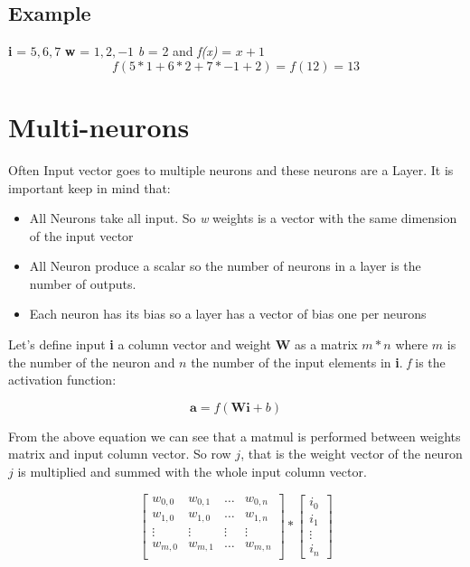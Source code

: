 \documentclass[12pt,a4paper,twoside,openright]{scrbook}
\begin{document}
\subsection{Example}
\textbf{i} = $5,6,7$ \textbf{w} = $1,2,-1$ \textit{b} = 2 and \textit{f(x)} = $x + 1$  
\begin{equation}
f(5*1 + 6*2 + 7*-1 + 2) = f(12) = 13
\end{equation}

\section{Multi-neurons}
Often Input vector goes to multiple neurons and these neurons are a Layer. It is important keep in mind that:
\begin{itemize}
\item All Neurons take all input. So \textit{w} weights is a vector with the same dimension of the input vector
\item All Neuron produce a scalar so the number of neurons in a layer is the number of  outputs.
\item Each neuron has its bias so a layer has a vector of bias one per neurons 
\end{itemize}

Let's define input \textbf{i} a column vector and weight \textbf{W} as a matrix $m*n$ where $m$ is the number of the neuron and $n$ the number of the input elements in \textbf{i}. \textit{f} is the activation function:

\begin{equation}
\textbf{a} = f(\textbf{W}\textbf{i} + b)
\end{equation}

From the above equation we can see that a matmul is performed between weights matrix and input column vector. So row $j$, that is the weight vector of the neuron $j$ is multiplied and summed with the whole input column vector.

\begin{equation}
  \begin{bmatrix}
w_{0,0} & w_{0,1} & \ldots & w_{0,n} \\
w_{1,0} & w_{1,0} & \ldots & w_{1,n} \\
\vdots & \vdots & \vdots & \vdots \\
w_{m,0} & w_{m,1} & \ldots & w_{m,n} \\
  \end{bmatrix} * \begin{bmatrix}
  i_0 \\ i_1 \\ \vdots \\ i_n
  \end{bmatrix}
\end{equation}
\end{document}
